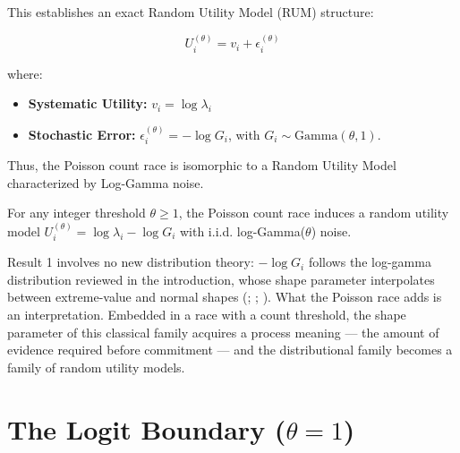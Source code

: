 \documentclass[
  man,
  floatsintext,
  longtable,
  a4paper,
  nolmodern,
  notxfonts,
  notimes,
  colorlinks=true,linkcolor=blue,citecolor=blue,urlcolor=blue]{apa7}
\providecommand{\tightlist}{%
  \setlength{\itemsep}{0pt}\setlength{\parskip}{0pt}}
\begin{document}
This establishes an exact Random Utility Model (RUM) structure:

\[
U_i^{(\theta)} = v_i + \epsilon_i^{(\theta)}
\]

where:

\begin{itemize}
\tightlist
\item
  \textbf{Systematic Utility:} \(v_i = \log \lambda_i\)\\
\item
  \textbf{Stochastic Error:} \(\epsilon_i^{(\theta)} = -\log G_i\), with
  \(G_i \sim \text{Gamma}(\theta, 1)\).
\end{itemize}

Thus, the Poisson count race is isomorphic to a Random Utility Model
characterized by Log-Gamma noise.

\begin{tcolorbox}[enhanced jigsaw, arc=.35mm, bottomrule=.15mm, bottomtitle=1mm, breakable, colback=white, colbacktitle=quarto-callout-note-color!10!white, colframe=quarto-callout-note-color-frame, coltitle=black, left=2mm, leftrule=.75mm, opacityback=0, opacitybacktitle=0.6, rightrule=.15mm, title={Result 1 (Log-Gamma Random Utility Family)}, titlerule=0mm, toprule=.15mm, toptitle=1mm]

For any integer threshold \(\theta \ge 1\), the Poisson count race
induces a random utility model
\(U_i^{(\theta)} = \log \lambda_i - \log G_i\) with i.i.d.
log-Gamma(\(\theta\)) noise.

\end{tcolorbox}

Result 1 involves no new distribution theory: \(-\log G_i\) follows the
log-gamma distribution reviewed in the introduction, whose shape
parameter interpolates between extreme-value and normal shapes
(; ; ). What
the Poisson race adds is an interpretation. Embedded in a race with a
count threshold, the shape parameter of this classical family acquires a
process meaning --- the amount of evidence required before commitment
--- and the distributional family becomes a family of random utility
models.

\section{\texorpdfstring{The Logit Boundary
(\(\theta = 1\))}{The Logit Boundary (\textbackslash theta = 1)}}\label{sec-logit-boundary}
\end{document}
